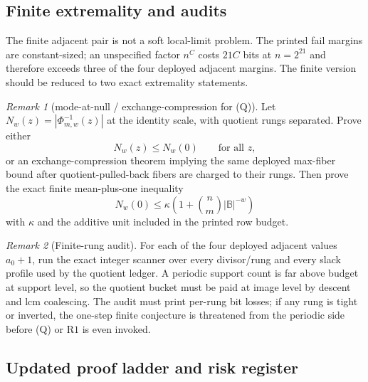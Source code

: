 \documentclass[11pt]{article}
\theoremstyle{definition}
\theoremstyle{remark}
\newtheorem{remark}[remark]{Remark}
\newcommand{\B}{\mathbb{B}}
\providecommand{\Rone}{\mathrm{R1}}
\begin{document}
\subsection{Finite extremality and audits}\label{subsec:capfr1-finite-audits}

The finite adjacent pair is not a soft local-limit problem.  The printed fail margins are constant-sized; an unspecified factor \(n^C\) costs \(21C\) bits at \(n=2^{21}\) and therefore exceeds three of the four deployed adjacent margins.  The finite version should be reduced to two exact extremality statements.

\begin{remark}[mode-at-null / exchange-compression for \textup{(Q)}]\label{prob:capfr1-mode-null}
Let \(N_w(z)=|\Phi_{m,w}^{-1}(z)|\) at the identity scale, with quotient rungs separated.  Prove either
\[
        N_w(z)
        \le
        N_w(0)
        \qquad\text{for all }z,
\]
or an exchange-compression theorem implying the same deployed max-fiber bound after quotient-pulled-back fibers are charged to their rungs.  Then prove the exact finite mean-plus-one inequality
\[
        N_w(0)
        \le
        \kappa\left(1+\binom n m |\B|^{-w}\right)
\]
with \(\kappa\) and the additive unit included in the printed row budget.
\end{remark}

\begin{remark}[Finite-rung audit]\label{prob:capfr1-rung-audit}
For each of the four deployed adjacent values \(a_0+1\), run the exact integer scanner over every divisor/rung and every slack profile used by the quotient ledger.  A periodic support count is far above budget at support level, so the quotient bucket must be paid at image level by descent and lcm coalescing.  The audit must print per-rung bit losses; if any rung is tight or inverted, the one-step finite conjecture is threatened from the periodic side before \textup{(Q)} or \(\Rone\) is even invoked.
\end{remark}

\subsection{Updated proof ladder and risk register}\label{subsec:capfr1-risk}
\end{document}
